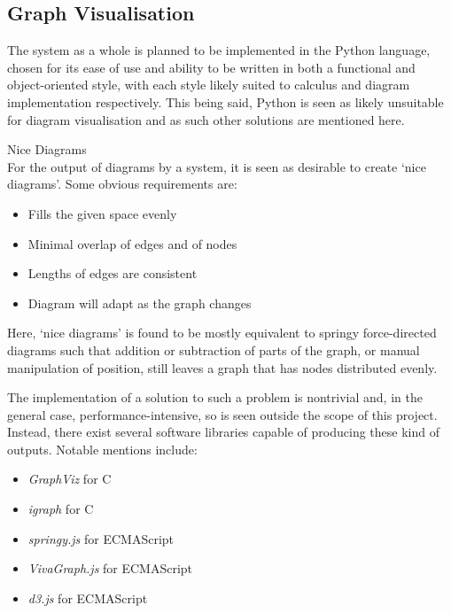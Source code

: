 \subsection{Graph Visualisation}

    The system as a whole is planned to be implemented in the Python language, chosen for its ease of use and ability to be written in both a functional and object-oriented style, with each style likely suited to calculus and diagram implementation respectively.
    This being said, Python is seen as likely unsuitable for diagram visualisation and as such other solutions are mentioned here.\\
    
    \begin{definition*}{Nice Diagrams\\}
        For the output of diagrams by a system, it is seen as desirable to create `nice diagrams'.
        Some obvious requirements are:
        \begin{itemize}
            \item Fills the given space evenly
            \item Minimal overlap of edges and of nodes
            \item Lengths of edges are consistent
            \item Diagram will adapt as the graph changes
        \end{itemize}
    \end{definition*}
    Here, `nice diagrams' is found to be mostly equivalent to springy force-directed diagrams such that addition or subtraction of parts of the graph, or manual manipulation of position, still leaves a graph that has nodes distributed evenly.


    \begin{examples}
        The implementation of a solution to such a problem is nontrivial and, in the general case, performance-intensive, so is seen outside the scope of this project.
        Instead, there exist several software libraries capable of producing these kind of outputs.
        Notable mentions include:
        \begin{itemize}
            \item \textit{GraphViz} for C~\footnotemark
            \item \textit{igraph} for C~\addtocounter{footnote}{-1}\footnotemark
            \item \textit{springy.js} for ECMAScript
            \item \textit{VivaGraph.js} for ECMAScript
            \item \textit{d3.js} for ECMAScript
        \end{itemize}
    \end{examples}

